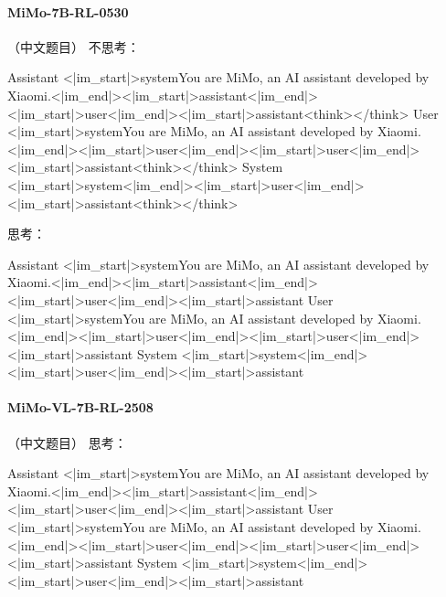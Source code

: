 \paragraph{MiMo-7B-RL-0530} （中文题目）
\noindent 不思考：
\begin{Rendering}
Assistant  <|im_start|>system\NL{}You are MiMo, an AI assistant developed by Xiaomi.<|im_end|>\NL{}<|im_start|>assistant\NL{}<|im_end|>\NL{}<|im_start|>user\NL{}<|im_end|>\NL{}<|im_start|>assistant\NL{}<think>\NL{}\NL{}</think>\NL{}
User       <|im_start|>system\NL{}You are MiMo, an AI assistant developed by Xiaomi.<|im_end|>\NL{}<|im_start|>user\NL{}<|im_end|>\NL{}<|im_start|>user\NL{}<|im_end|>\NL{}<|im_start|>assistant\NL{}<think>\NL{}\NL{}</think>\NL{}
System     <|im_start|>system\NL{}<|im_end|>\NL{}<|im_start|>user\NL{}<|im_end|>\NL{}<|im_start|>assistant\NL{}<think>\NL{}\NL{}</think>\NL{}
\end{Rendering}
\noindent 思考：
\begin{Rendering}
Assistant  <|im_start|>system\NL{}You are MiMo, an AI assistant developed by Xiaomi.<|im_end|>\NL{}<|im_start|>assistant\NL{}<|im_end|>\NL{}<|im_start|>user\NL{}<|im_end|>\NL{}<|im_start|>assistant\NL{}
User       <|im_start|>system\NL{}You are MiMo, an AI assistant developed by Xiaomi.<|im_end|>\NL{}<|im_start|>user\NL{}<|im_end|>\NL{}<|im_start|>user\NL{}<|im_end|>\NL{}<|im_start|>assistant\NL{}
System     <|im_start|>system\NL{}<|im_end|>\NL{}<|im_start|>user\NL{}<|im_end|>\NL{}<|im_start|>assistant\NL{}
\end{Rendering}
\paragraph{MiMo-VL-7B-RL-2508} （中文题目）
\noindent 思考：
\begin{Rendering}
Assistant  <|im_start|>system\NL{}You are MiMo, an AI assistant developed by Xiaomi.<|im_end|>\NL{}<|im_start|>assistant\NL{}<|im_end|>\NL{}<|im_start|>user\NL{}<|im_end|>\NL{}<|im_start|>assistant\NL{}
User       <|im_start|>system\NL{}You are MiMo, an AI assistant developed by Xiaomi.<|im_end|>\NL{}<|im_start|>user\NL{}<|im_end|>\NL{}<|im_start|>user\NL{}<|im_end|>\NL{}<|im_start|>assistant\NL{}
System     <|im_start|>system\NL{}<|im_end|>\NL{}<|im_start|>user\NL{}<|im_end|>\NL{}<|im_start|>assistant\NL{}
\end{Rendering}
